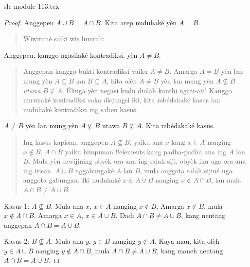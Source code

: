 \begin{filecontents*}[overwrite]{slc-module-113.tex}
\begin{proof}
  Anggepen $A \cup B = A \cap B$.
  Kita arep nuduhaké yèn $A = B$.
  \begin{quote}
    Wiwitané saiki wis lumrah:
  \end{quote}
  Anggepen, kanggo ngasilaké kontradiksi,
  yèn $A \neq B$.
  \begin{quote}
    Anggepan kanggo bukti kontradiksi yaiku
    $A \neq B$. Amarga $A = B$ yèn lan mung
    yèn $A \subseteq B$ lan $B \subseteq A$,
    kita olèh $A \neq B$ yèn lan mung yèn
    $A \nsubseteq B$ \emph{utawa}
    $B \nsubseteq
    A$. Élinga yèn negasi kudu diolah kanthi
    ngati-ati!{} Kanggo nurunaké kontradiksi
    saka disjungsi iki, kita mbédakaké kasus
    lan nuduhaké kontradiksi ing saben kasus.
  \end{quote}
  $A \neq B$ yèn lan mung yèn $A \nsubseteq B$
  utawa $B \nsubseteq A$. Kita mbédakaké kasus.
  \begin{quote}
    Ing kasus kapisan, anggepen $A \nsubseteq B$,
    yaiku ana $x$ kang $x \in A$ nanging
    $x \notin B$. $A \cap B$ yaiku
    himpunan !!{element}s kang padha-padha
    ana ing $A$ lan $B$. Mula yèn sawijining
    obyèk ora ana ing salah siji, obyèk iku
    uga ora ana ing irisan. $A \cup B$
    nggabungaké $A$ lan $B$, mula anggota
    salah sijiné uga anggota gabungan.
    Iki nuduhaké $x \in A \cup B$ nanging
    $x \notin A \cap
    B$, lan mula $A \cap B \neq A \cup B$.
  \end{quote}


  Kasus 1: $A \nsubseteq B$. Mula ana $x$,
  $x \in A$ nanging $x \notin
  B$. Amarga $x \notin B$, mula
  $x \notin A \cap B$. Amarga $x \in A$,
  $x \in A \cup B$. Dadi
  $A \cap B \neq A \cup B$, kang nentang
  anggepan $A \cap B = A \cup B$.

  Kasus 2: $B \nsubseteq A$. Mula ana $y$,
  $y \in B$ nanging $y \notin
  A$. Kaya mau, kita olèh $y \in A \cup B$
  nanging $y \notin A \cap B$, mula
  $A \cap B \neq A \cup B$, kang maneh
  nentang $A \cap B = A \cup
  B$.
\end{proof}


\end{filecontents*}

